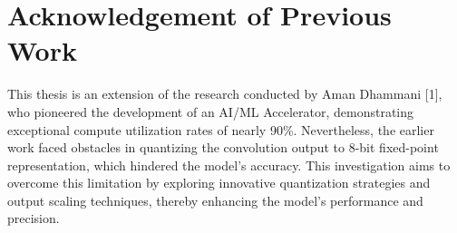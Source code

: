 \section{Acknowledgement of Previous Work}
This thesis is an extension of the research conducted by Aman Dhammani [1], who pioneered the development of an AI/ML Accelerator, demonstrating exceptional compute utilization rates of nearly 90\%. Nevertheless, the earlier work faced obstacles in quantizing the convolution output to 8-bit fixed-point representation, which hindered the model's accuracy. This investigation aims to overcome this limitation by exploring innovative quantization strategies and output scaling techniques, thereby enhancing the model's performance and precision.

 